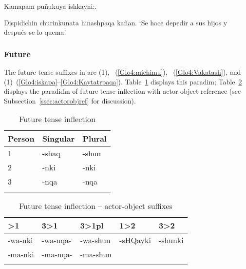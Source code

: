%
{Kamapam  puñukuya\pb{:} ishkayni:.}%
{}%
{}{}%

%
{Dispidichin churinkunata hinashpaqa kañan.}%
{}%
{‘Se hace depedir a sus hijos y después se lo quema’.}%
{}{}%
 
\subsubsection{Future}\label{ssec:future}
The future tense suffixes in \SYQ{} are  (1), ~(\ref{Glo4:michimu}), ~(\ref{Glo4:Vakatash}), and  (1)~(\ref{Glo4:iskapa}--\ref{Glo4:Kaytatrpaqa}). Table~\ref{Tab17a} displays this paradim; Table~\ref{Tab17b} displays the paradidm of future tense inflection with actor-object reference (see Subsection~\ref{ssec:actorobjref} for discussion).

\begin{table}
\small\centering
\caption{Future tense inflection}\label{Tab17a}
\begin{tabular}{lll}
\lsptoprule
Person		& Singular		& Plural	\\
\midrule
1			&-shaq			&-shun		\\[2ex]
2			&-nki			&-nki		\\[2ex]
3			&-nqa			&-nqa		\\
\lspbottomrule
\end{tabular}
\end{table}

\begin{table}
\small\centering
\caption{Future tense inflection -- actor-object suffixes}\label{Tab17b}
\begin{tabular}{lllll}
\lsptoprule
2>1	&	3>1	&	3>1pl	&	1>2	&	3>2	\\
\midrule
-wa-nki\tss{\AMV,\LT}	
&	-wa-nqa-\uo\tss{\AMV,\LT}	
&	-wa-shun\tss{\AMV,\LT}	
&	-sHQayki	
& -shunki\\
-ma-nki\tss{\ACH,\CH,\SP}	
&	-ma-nqa-\uo\tss{\ACH,\CH,\SP}	
&	-ma-shun\tss{\ACH,\CH,\SP}	
&	 	
& 	\\
\lspbottomrule
\end{tabular}
\end{table}

